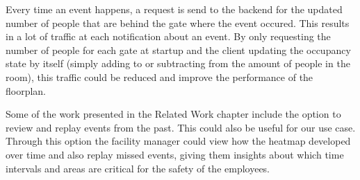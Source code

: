 Every time an event happens, a request is send to the backend for the updated number of people that are behind the gate where the event occured. This results in a lot of traffic at each notification about an event. By only requesting the number of people for each gate at startup and the client updating the occupancy state by itself (simply adding to or subtracting from the amount of people in the room), this traffic could be reduced and improve the performance of the floorplan. 

Some of the work presented in the Related Work chapter include the option to review and replay events from the past. This could also be useful for our use case. Through this option the facility manager could view how the heatmap developed over time and also replay missed events, giving them insights about which time intervals and areas are critical for the safety of the employees.

\clearpage

